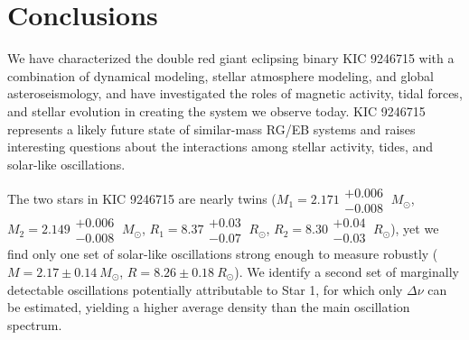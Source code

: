 \section{Conclusions}\label{conclude}

We have characterized the double red giant eclipsing binary KIC 9246715 with a combination of dynamical modeling, stellar atmosphere modeling, and global asteroseismology, and have investigated the roles of magnetic activity, tidal forces, and stellar evolution in creating the system we observe today. KIC 9246715 represents a likely future state of similar-mass RG/EB systems and raises interesting questions about the interactions among stellar activity, tides, and solar-like oscillations.

The two stars in KIC 9246715 are nearly twins ($M_1 = 2.171\substack{+0.006 \\ -0.008} \ M_{\odot}$, $M_2 = 2.149\substack{+0.006 \\ -0.008} \ M_{\odot}$, $R_1 = 8.37\substack{+0.03 \\ -0.07} \ R_{\odot}$, $R_2 = 8.30\substack{+0.04 \\ -0.03} \ R_{\odot}$), yet we find only one set of solar-like oscillations strong enough to measure robustly ($M = 2.17 \pm 0.14 \ M_{\odot}$, $R = 8.26 \pm 0.18 \ R_{\odot}$).  We identify a second set of marginally detectable oscillations potentially attributable to Star 1, for which only $\Delta \nu$ can be estimated, yielding a higher average density than the main oscillation spectrum. 

